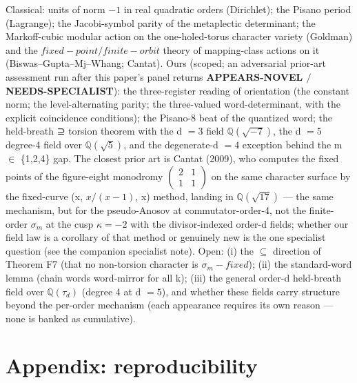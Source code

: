 \documentclass[11pt]{article}
\theoremstyle{plain}
\theoremstyle{definition}
\theoremstyle{remark}
\begin{document}
Classical: units of norm \(-1\) in real quadratic orders (Dirichlet); the Pisano period (Lagrange); the Jacobi-symbol parity of the metaplectic determinant; the Markoff-cubic modular action on the one-holed-torus character variety (Goldman) and the \(fixed-point/finite-orbit\) theory of mapping-class actions on it (Biswas–Gupta–Mj–Whang; Cantat). Ours (scoped; an adversarial prior-art assessment run after this paper's panel returns \textbf{APPEARS-NOVEL \(/\) NEEDS-SPECIALIST}): the three-register reading of orientation (the constant norm; the level-alternating parity; the three-valued word-determinant, with the explicit coincidence conditions); the Pisano-8 beat of the quantized word; the held-breath ⊇ torsion theorem with the d \(= 3\) field \(\mathbb{Q}(\sqrt{-7})\), the d \(= 5\) degree-4 field over \(\mathbb{Q}(\sqrt{5})\), and the degenerate-d \(= 4\) exception behind the m \(\in \) \{1,2,4\} gap. The closest prior art is Cantat (2009), who computes the fixed points of the figure-eight monodromy \(\left(\begin{smallmatrix}2 & 1\\1 & 1\end{smallmatrix}\right)\) on the same character surface by the fixed-curve (x, \(x/(x-1)\), x) method, landing in \(\mathbb{Q}(\sqrt{17})\) — the same mechanism, but for the pseudo-Anosov at commutator-order-4, not the finite-order \(\sigma _{m}\) at the cusp \(\kappa  = -2\) with the divisor-indexed order-d fields; whether our field law is a corollary of that method or genuinely new is the one specialist question (see the companion specialist note). Open: (i) the \(\subseteq \) direction of Theorem F7 (that no non-torsion character is \(\sigma _{m}-fixed\)); (ii) the standard-word lemma (chain words word-mirror for all k); (iii) the general order-d held-breath field over \(\mathbb{Q}(\tau _{d})\) (degree 4 at d \(= 5\)), and whether these fields carry structure beyond the per-order mechanism (each appearance requires its own reason — none is banked as cumulative).

\section{Appendix: reproducibility}
\end{document}
